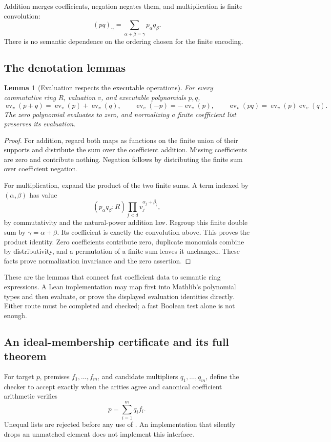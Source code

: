 \documentclass[11pt,a4paper]{article}
\newcommand{\code}[1]{\texttt{\detokenize{#1}}}
\newcommand{\ev}{\operatorname{ev}}
\theoremstyle{plain}
\newtheorem{lemma}[theorem]{Lemma}
\theoremstyle{definition}
\begin{document}
Addition merges coefficients, negation negates them, and multiplication is finite convolution:
\[
 (pq)_\gamma=\sum_{\alpha+\beta=\gamma}p_\alpha q_\beta.
\]
There is no semantic dependence on the ordering chosen for the finite encoding.

\subsection{The denotation lemmas}
\begin{lemma}[Evaluation respects the executable operations]
For every commutative ring $R$, valuation $v$, and executable polynomials $p,q$,
\[
 \ev_v(p+q)=\ev_v(p)+\ev_v(q),\qquad
 \ev_v(-p)=-\ev_v(p),\qquad
 \ev_v(pq)=\ev_v(p)\ev_v(q).
\]
The zero polynomial evaluates to zero, and normalizing a finite coefficient list preserves its evaluation.
\end{lemma}
\begin{proof}
For addition, regard both maps as functions on the finite union of their supports and distribute the sum over the coefficient addition. Missing coefficients are zero and contribute nothing. Negation follows by distributing the finite sum over coefficient negation.

For multiplication, expand the product of the two finite sums. A term indexed by $(\alpha,\beta)$ has value
\[
 (p_\alpha q_\beta:R)
   \prod_{j<d}v_j^{\alpha_j+\beta_j},
\]
by commutativity and the natural-power addition law. Regroup this finite double sum by $\gamma=\alpha+\beta$. Its coefficient is exactly the convolution above. This proves the product identity. Zero coefficients contribute zero, duplicate monomials combine by distributivity, and a permutation of a finite sum leaves it unchanged. These facts prove normalization invariance and the zero assertion.
\end{proof}
These are the lemmas that connect fast coefficient data to semantic ring expressions. A Lean implementation may map first into Mathlib's polynomial types and then evaluate, or prove the displayed evaluation identities directly. Either route must be completed and checked; a fast Boolean test alone is not enough.

\subsection{An ideal-membership certificate and its full theorem}
For target $p$, premises $f_1,\ldots,f_m$, and candidate multipliers $q_1,\ldots,q_m$, define the checker to accept exactly when the arities agree and canonical coefficient arithmetic verifies
\begin{equation}
 p=\sum_{i=1}^m q_if_i.\label{eq:polycert}
\end{equation}
Unequal lists are rejected before any use of \code{zip}. An implementation that silently drops an unmatched element does not implement this interface.
\end{document}
